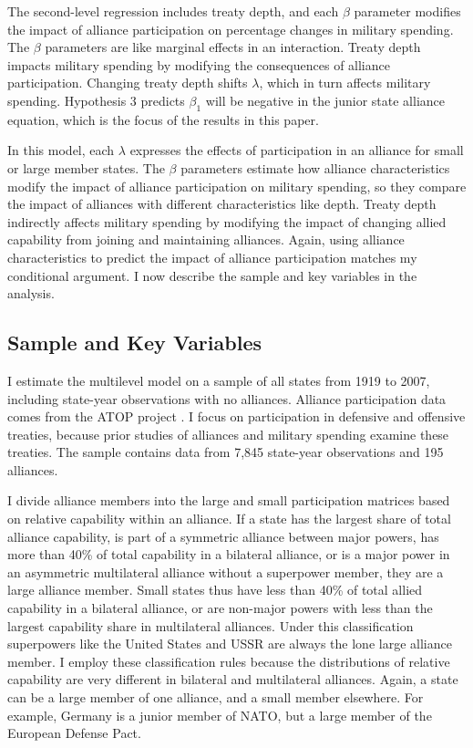 \documentclass[12pt]{article}
\begin{document}
The second-level regression includes treaty depth, and each $\beta$ parameter modifies the impact of alliance participation on percentage changes in military spending. 
The $\beta$ parameters are like marginal effects in an interaction. 
Treaty depth impacts military spending by modifying the consequences of alliance participation. 
Changing treaty depth shifts $\lambda$, which in turn affects military spending.
Hypothesis 3 predicts $\beta_1$ will be negative in the junior state alliance equation, which is the focus of the results in this paper. 


In this model, each $\lambda$ expresses the effects of participation in an alliance for small or large member states.
The $\beta$ parameters estimate how alliance characteristics modify the impact of alliance participation on military spending, so they compare the impact of alliances with different characteristics like depth.
Treaty depth indirectly affects military spending by modifying the impact of changing allied capability from joining and maintaining alliances.  
Again, using alliance characteristics to predict the impact of alliance participation matches my conditional argument. 
I now describe the sample and key variables in the analysis.  



\subsection{Sample and Key Variables} 

I estimate the multilevel model on a sample of all states from 1919 to 2007, including state-year observations with no alliances. 
Alliance participation data comes from the ATOP project \citep{Leedsetal2002}.  
I focus on participation in defensive and offensive treaties, because prior studies of alliances and military spending examine these treaties. 
The sample contains data from 7,845 state-year observations and 195 alliances. 


I divide alliance members into the large and small participation matrices based on relative capability within an alliance. 
If a state has the largest share of total alliance capability, is part of a symmetric alliance between major powers, has more than 40\% of total capability in a bilateral alliance, or is a major power in an asymmetric multilateral alliance without a superpower member, they are a large alliance member. 
Small states thus have less than 40\% of total allied capability in a bilateral alliance, or are non-major powers with less than the largest capability share in multilateral alliances. 
Under this classification superpowers like the United States and USSR are always the lone large alliance member. 
I employ these classification rules because the distributions of relative capability are very different in bilateral and multilateral alliances. 
Again, a state can be a large member of one alliance, and a small member elsewhere. 
For example, Germany is a junior member of NATO, but a large member of the European Defense Pact.
\end{document}
